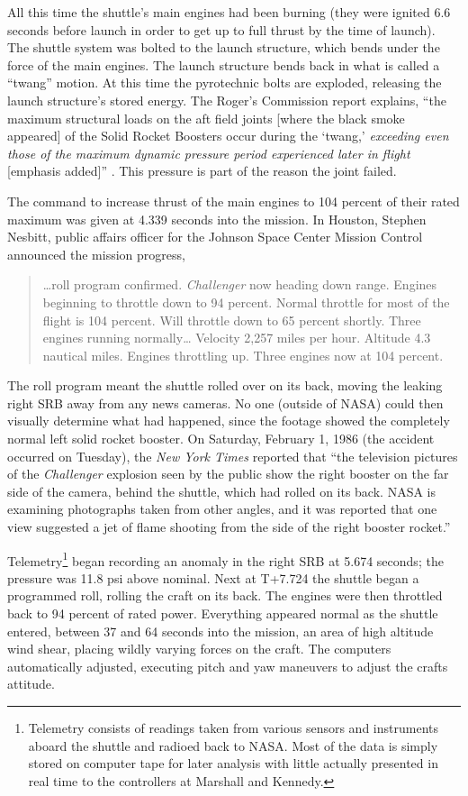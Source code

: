 All this time the shuttle's main engines had been burning
(they were ignited 6.6 seconds before launch in order to get
up to full thrust by the time of launch).  The shuttle
system was bolted to the launch structure, which bends under
the force of the main engines.  The launch structure bends
back in what is called a ``twang'' motion.  At this time the
pyrotechnic bolts are exploded, releasing the launch
structure's stored energy.  The Roger's Commission report
explains, ``the maximum structural loads on the aft field
joints [where the black smoke appeared] of the Solid Rocket
Boosters occur during the `twang,' {\em exceeding even
those of the maximum dynamic pressure period experienced
later in flight} [emphasis added]'' \cite[p. 19]{rogers}.
This pressure is part of the reason the joint failed.

The command to increase thrust of the main engines to 104
percent of their rated maximum was given at 4.339 seconds
into the mission.  In Houston, Stephen Nesbitt, public
affairs officer for the Johnson Space Center Mission Control
announced the mission progress,
\begin{singlespace}
\begin{quotation}
\noindent
\ldots roll program confirmed.  {\em Challenger} now heading
down range.  Engines beginning to throttle down to 94
percent.  Normal throttle for most of the flight is 104
percent.  Will throttle down to 65 percent shortly.  Three
engines running normally\ldots
Velocity 2,257 miles per hour.  Altitude 4.3
nautical miles.  Engines throttling up.  Three engines now
at 104 percent.
\end{quotation}
\end{singlespace}
The roll program meant the shuttle rolled over on its back,
moving the leaking right SRB away from any news cameras.  No
one (outside of NASA) could then visually determine what had
happened, since
the footage showed the completely normal left solid rocket
booster.  On Saturday, February 1, 1986 (the accident
occurred on Tuesday), the {\em
New York Times} reported that ``the television pictures of
the {\em Challenger} explosion seen by the public show the
right booster on the far side of the camera, behind the
shuttle, which had rolled on its back.  NASA is examining
photographs taken from other angles, and it was reported
that one view suggested a jet of flame shooting from the
side of the right booster rocket.''

Telemetry\footnote{Telemetry consists of readings taken from
various sensors and instruments aboard the shuttle and
radioed back to NASA.
Most of the data is simply stored on computer tape for later
analysis with little actually presented in real time to the
controllers at Marshall and Kennedy.} began recording an
anomaly in the right SRB at 5.674 seconds; the pressure was
11.8 psi above nominal.
Next at T+7.724 the shuttle began a programmed roll, rolling
the craft on its back.
The engines were then throttled back to 94 percent of rated
power.
Everything appeared normal as the shuttle entered,
between 37 and 64 seconds into the mission, an area of high
altitude wind shear, placing wildly varying forces on the
craft.
The computers automatically adjusted, executing pitch and
yaw maneuvers to adjust the crafts attitude.

